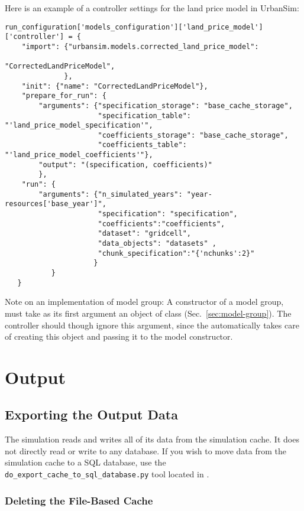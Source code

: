 Here is an example of a controller settings for the land price model in UrbanSim:
\modelsindex\datasetindex
\begin{verbatim}
run_configuration['models_configuration']['land_price_model']['controller'] = {
    "import": {"urbansim.models.corrected_land_price_model":
                                                "CorrectedLandPriceModel",
              },
    "init": {"name": "CorrectedLandPriceModel"},
    "prepare_for_run": {
        "arguments": {"specification_storage": "base_cache_storage",
                      "specification_table": "'land_price_model_specification'",
                      "coefficients_storage": "base_cache_storage",
                      "coefficients_table": "'land_price_model_coefficients'"},
        "output": "(specification, coefficients)"
        },
    "run": {
        "arguments": {"n_simulated_years": "year-resources['base_year']",
                      "specification": "specification",
                      "coefficients":"coefficients",
                      "dataset": "gridcell",
                      "data_objects": "datasets" ,
                      "chunk_specification":"{'nchunks':2}"
                     }
           }
   }
\end{verbatim}
Note on an implementation of model group: A constructor of 
a model group, must take as its first argument an object of class  (Sec.~\ref{sec:model-group}). 
The controller should though ignore this argument, since the  automatically takes care of creating this object 
and passing it to the model constructor.

\section{Output}
%
\subsection{Exporting the Output Data}

The simulation reads and writes all of its data from the simulation cache.  It 
does not directly read or write to any database. 
If you wish to move data from the simulation cache to a SQL database, use the
\verb|do_export_cache_to_sql_database.py| tool located in
. 


\subsubsection{Deleting the File-Based Cache}

